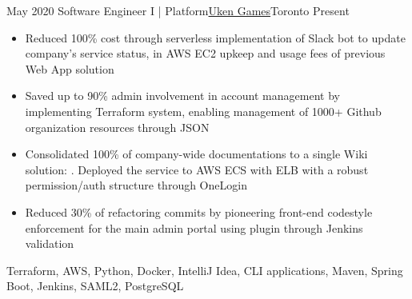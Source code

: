 %
%
%
\begin{experiences}
  \experience
    {May 2020}   {Software Engineer I | Platform}{\href{https://uken.com}{Uken Games}}{Toronto}
    {Present} {
                    \begin{itemize}
                        \item Reduced 100\% cost through serverless implementation of Slack bot to update company's service status, in AWS EC2 upkeep and usage fees of previous Web App solution
                        
                        \item Saved up to 90\% admin involvement in account management by implementing Terraform system, enabling management of 1000+ Github organization resources through JSON
                        
                        \item Consolidated 100\% of company-wide documentations to a single Wiki solution: . Deployed the service to AWS ECS with ELB with a robust permission/auth structure through OneLogin 

                        \item Reduced 30\% of refactoring commits by pioneering front-end codestyle enforcement for the main admin portal using   plugin through Jenkins validation
                    \end{itemize}
                    }
                    {Terraform, AWS, Python, Docker, IntelliJ Idea, CLI applications, Maven, Spring Boot, Jenkins, SAML2, PostgreSQL}
\end{experiences}
